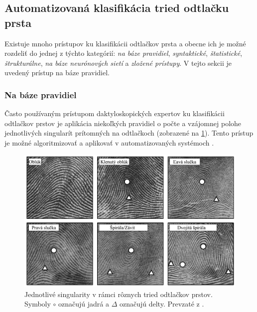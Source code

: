   \subsection{Automatizovaná klasifikácia tried odtlačku prsta} \label{sec:auto_klasif}
  Existuje mnoho prístupov ku klasifikácii odtlačkov prsta a obecne ich je možné rozdeliť do jednej z týchto kategórií: \emph{na báze pravidiel},
  \emph{syntaktické}, \emph{štatistické}, \emph{štrukturálne}, \emph{na báze neurónových sietí} a \emph{zložené prístupy}. V tejto sekcii je uvedený
  prístup na báze pravidiel.

  \subsubsection*{Na báze pravidiel} \label{sec:rule-based}
  Často používaným prístupom daktyloskopických expertov ku klasifikácii odtlačkov prstov je aplikácia niekoľkých pravidiel o počte a vzájomnej polohe
  jednotlivých singularít prítomných na odtlačkoch (zobrazené na \ref{obr:singularity_v_triedach}). Tento prístup je možné algoritmizovať a aplikovať
  v automatizovaných systémoch \cite{Handbook}.

  \begin{figure}[h]
    \centering
    \includegraphics[width=0.85\linewidth]{obrazky-figures/singularity_v_triedach.png}
    \caption{Jednotlivé singularity v rámci rôznych tried odtlačkov prstov. Symboly $\circ{}$ označujú jadrá a $\Delta{}$ označujú delty.
    Prevzaté z \cite{Handbook}.}
    \label{obr:singularity_v_triedach}
  \end{figure}

